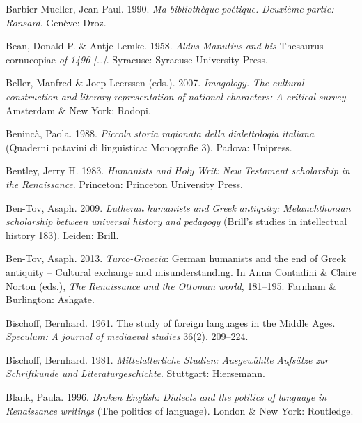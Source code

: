 Barbier-Mueller, Jean Paul. 1990. \textit{Ma} \textit{bibliothèque} \textit{poétique.} \textit{Deuxième} \textit{partie:} \textit{Ronsard}. Genève: Droz.

Bean, Donald P. \& Antje Lemke. 1958. \textit{Aldus} \textit{Manutius} \textit{and} \textit{his} Thesaurus cornucopiae \textit{of} \textit{1496} \textit{[…].} Syracuse: Syracuse University Press.

Beller, Manfred \& Joep Leerssen (eds.). 2007. \textit{Imagology.} \textit{The} \textit{cultural} \textit{construction} \textit{and} \textit{literary} \textit{representation} \textit{of} \textit{national} \textit{characters:} \textit{A} \textit{critical} \textit{survey}. Amsterdam \& New York: Rodopi.

Benincà, Paola. 1988. \textit{Piccola} \textit{storia} \textit{ragionata} \textit{della} \textit{dialettologia} \textit{italiana} (Quaderni patavini di linguistica: Monografie 3). Padova: Unipress.

Bentley, Jerry H. 1983. \textit{Humanists} \textit{and} \textit{Holy} \textit{Writ:} \textit{New} \textit{Testament} \textit{scholarship} \textit{in} \textit{the} \textit{Renaissance}. Princeton: Princeton University Press.

Ben-Tov, Asaph. 2009. \textit{Lutheran} \textit{humanists} \textit{and} \textit{Greek} \textit{antiquity:} \textit{Melanchthonian} \textit{scholarship} \textit{between} \textit{universal} \textit{history} \textit{and} \textit{pedagogy} (Brill’s studies in intellectual history 183). Leiden: Brill.

Ben-Tov, Asaph. 2013. \textit{Turco-Graecia}: German humanists and the end of Greek antiquity – Cultural exchange and misunderstanding. In Anna Contadini \& Claire Norton (eds.), \textit{The} \textit{Renaissance} \textit{and} \textit{the} \textit{Ottoman} \textit{world}, 181–195. Farnham \& Burlington: Ashgate.

Bischoff, Bernhard. 1961. The study of foreign languages in the Middle Ages. \textit{Speculum:} \textit{A} \textit{journal} \textit{of} \textit{mediaeval} \textit{studies} 36(2). 209–224.

Bischoff, Bernhard. 1981. \textit{Mittelalterliche} \textit{Studien:} \textit{Ausgewählte} \textit{Aufsätze} \textit{zur} \textit{Schriftkunde} \textit{und} \textit{Literaturgeschichte}. Stuttgart: Hiersemann.

Blank, Paula. 1996. \textit{Broken} \textit{English:} \textit{Dialects} \textit{and} \textit{the} \textit{politics} \textit{of} \textit{language} \textit{in} \textit{Renaissance} \textit{writings} (The politics of language). London \& New York: Routledge.

